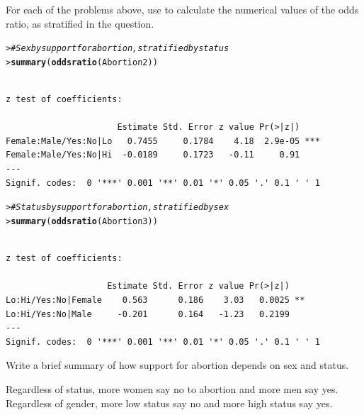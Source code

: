\documentclass[10pt]{report}\usepackage[]{graphicx}\usepackage[]{color}
\makeatletter
\newcommand{\hlcom}[1]{\textcolor[rgb]{0.678,0.584,0.686}{\textit{#1}}}%
\newcommand{\hlstd}[1]{\textcolor[rgb]{0.345,0.345,0.345}{#1}}%
\newcommand{\hlkwd}[1]{\textcolor[rgb]{0.737,0.353,0.396}{\textbf{#1}}}%
\newenvironment{kframe}{%
 \def\at@end@of@kframe{}%
 \ifinner\ifhmode%
  \def\at@end@of@kframe{\end{minipage}}%
  \begin{minipage}{\columnwidth}%
 \fi\fi%
 \def\FrameCommand##1{\hskip\@totalleftmargin \hskip-\fboxsep
 \colorbox{shadecolor}{##1}\hskip-\fboxsep
     \hskip-\linewidth \hskip-\@totalleftmargin \hskip\columnwidth}%
 \MakeFramed {\advance\hsize-\width
   \@totalleftmargin\z@ \linewidth\hsize
   \@setminipage}}%
 {\par\unskip\endMakeFramed%
 \at@end@of@kframe}
\newenvironment{knitrout}{}{} %
\renewenvironment{knitrout}{\small\renewcommand{\baselinestretch}{.85}}{} %
\makeatother
\begin{document}
\begin{Exercises}
\begin{enumerate*}
    \item For each of the problems above, use  to calculate the numerical
    values of the odds ratio, as stratified in the question.
    \begin{ans}
\begin{knitrout}\footnotesize
{}\color{fgcolor}\begin{kframe}
\begin{alltt}
\hlstd{> }     \hlcom{# Sex by support for abortion, stratified by status}
\hlstd{> }\hlkwd{summary}\hlstd{(}\hlkwd{oddsratio}\hlstd{(Abortion2))}
\end{alltt}
\begin{verbatim}

z test of coefficients:

                      Estimate Std. Error z value Pr(>|z|)    
Female:Male/Yes:No|Lo   0.7455     0.1784    4.18  2.9e-05 ***
Female:Male/Yes:No|Hi  -0.0189     0.1723   -0.11     0.91    
---
Signif. codes:  0 '***' 0.001 '**' 0.01 '*' 0.05 '.' 0.1 ' ' 1
\end{verbatim}
\begin{alltt}
\hlstd{> }     \hlcom{# Status by support for abortion, stratified by sex}
\hlstd{> }\hlkwd{summary}\hlstd{(}\hlkwd{oddsratio}\hlstd{(Abortion3))}
\end{alltt}
\begin{verbatim}

z test of coefficients:

                    Estimate Std. Error z value Pr(>|z|)   
Lo:Hi/Yes:No|Female    0.563      0.186    3.03   0.0025 **
Lo:Hi/Yes:No|Male     -0.201      0.164   -1.23   0.2199   
---
Signif. codes:  0 '***' 0.001 '**' 0.01 '*' 0.05 '.' 0.1 ' ' 1
\end{verbatim}
\end{kframe}
\end{knitrout}
    \end{ans}
    
    \item Write a brief summary of how support for abortion depends on sex and status.
    \begin{ans}
    Regardless of status, more women say no to abortion and more men say yes. 
    Regardless of gender, more low status say no and more high status say yes.
    \end{ans}
    
  \end{enumerate*}


\end{Exercises}
\end{document}
